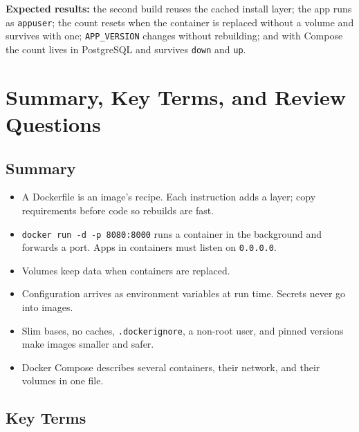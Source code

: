 \textbf{Expected results:} the second build reuses the cached install layer; the app runs as \texttt{appuser}; the count resets when the container is replaced without a volume and survives with one; \texttt{APP\_VERSION} changes without rebuilding; and with Compose the count lives in PostgreSQL and survives \texttt{down} and \texttt{up}.

\section{Summary, Key Terms, and Review Questions}\label{05-docker-in-practice:summary-key-terms-and-review-questions}

\subsection*{Summary}\label{05-docker-in-practice:summary}

\begin{itemize}
\tightlist
\item
  A Dockerfile is an image's recipe. Each instruction adds a layer; copy requirements before code so rebuilds are fast.
\item
  \texttt{docker\ run\ -}\allowbreak{}\texttt{d\ -}\allowbreak{}\texttt{p\ 8080:}\allowbreak{}\texttt{8000} runs a container in the background and forwards a port. Apps in containers must listen on \texttt{0.0.0.0}.
\item
  Volumes keep data when containers are replaced.
\item
  Configuration arrives as environment variables at run time. Secrets never go into images.
\item
  Slim bases, no caches, \texttt{.dockerignore}, a non-root user, and pinned versions make images smaller and safer.
\item
  Docker Compose describes several containers, their network, and their volumes in one file.
\end{itemize}


\subsection*{Key Terms}\label{05-docker-in-practice:key-terms}

